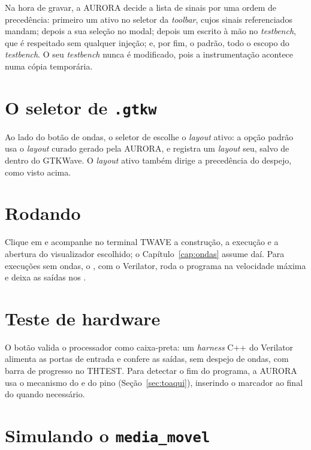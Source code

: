 Na hora de gravar, a AURORA decide a lista de sinais por uma ordem de precedência: primeiro um  ativo no seletor da \textit{toolbar}, cujos sinais referenciados mandam; depois a sua seleção no modal; depois um  escrito à mão no \textit{testbench}, que é respeitado sem qualquer injeção; e, por fim, o padrão, todo o escopo do \textit{testbench}. O seu \textit{testbench} nunca é modificado, pois a instrumentação acontece numa cópia temporária.

\section{O seletor de \texttt{.gtkw}}

Ao lado do botão de ondas, o seletor de  escolhe o \textit{layout} ativo: a opção padrão usa o \textit{layout} curado gerado pela AURORA, e  registra um \textit{layout} seu, salvo de dentro do GTKWave. O \textit{layout} ativo também dirige a precedência do despejo, como visto acima.

\section{Rodando}

Clique em  e acompanhe no terminal TWAVE a construção, a execução e a abertura do visualizador escolhido; o Capítulo~\ref{cap:ondas} assume daí. Para execuções sem ondas, o , com o Verilator, roda o programa na velocidade máxima e deixa as saídas nos .

\section{Teste de hardware}

O botão  valida o processador como caixa-preta: um \textit{harness} C++ do Verilator alimenta as portas de entrada e confere as saídas, sem despejo de ondas, com barra de progresso no THTEST. Para detectar o fim do programa, a AURORA usa o mecanismo do  e do pino  (Seção~\ref{sec:toaqui}), inserindo o marcador ao final do  quando necessário.

\section{Simulando o \texttt{media\_movel}}

